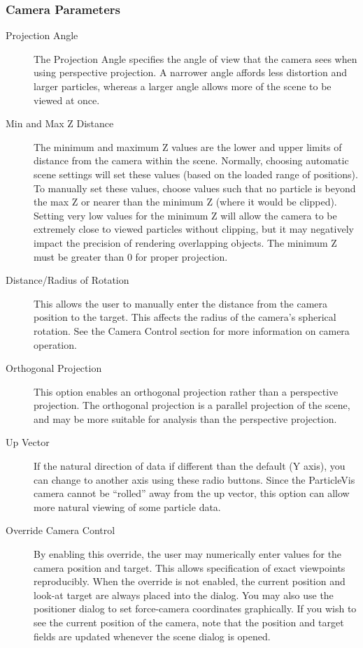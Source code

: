 \subsubsection{Camera Parameters}
\begin{description}
\item[Projection Angle]
   The Projection Angle specifies the angle of view that the camera sees when using perspective projection.  A narrower angle affords less distortion and larger particles, whereas a larger angle allows more of the scene to be viewed at once.
\item[Min and Max Z Distance]
The minimum and maximum Z values are the lower and upper limits of distance from the camera within the scene.  Normally, choosing automatic scene settings will set these values (based on the loaded range of positions).  To manually set these values,  choose values such that no particle is beyond the max Z or nearer than the minimum Z (where it would be clipped).  Setting very low values for the minimum Z will allow the camera to be extremely close to viewed particles without clipping, but it may negatively impact the precision of rendering overlapping objects.  The minimum Z must be greater than 0 for proper projection.

\item[Distance/Radius of Rotation]
   This allows the user to manually enter the distance from the camera position to the target.  This affects the radius of the camera's spherical rotation.  See the Camera Control section for more information on camera operation.
   
\item[Orthogonal Projection]
   This option enables an orthogonal projection rather than a perspective projection.  The orthogonal projection is a parallel projection of the scene, and may be more suitable for analysis than the perspective projection.
   
\item[Up Vector]
  If the natural direction of data if different than the default (Y axis), you can change to another axis using these radio buttons.  Since the ParticleVis camera cannot be ``rolled'' away from the up vector, this option can allow more natural viewing of some particle data.

\item[Override Camera Control]
By enabling this override, the user may numerically enter values for the camera position and target.  This allows specification of exact viewpoints reproducibly.  When the override is not enabled, the current position and look-at target are always placed into the dialog.  You may also use the positioner dialog to set force-camera coordinates graphically.  If you wish to see the current position of the camera, note that the position and target fields are updated whenever the scene dialog is opened.
\end{description}

